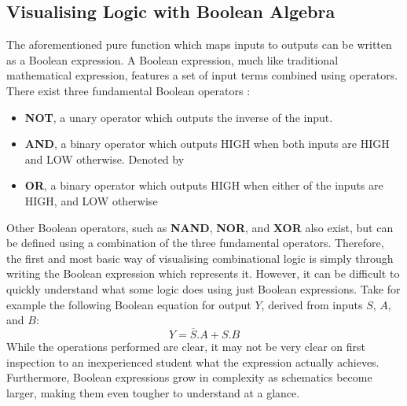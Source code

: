 \subsection{Visualising Logic with Boolean Algebra}
The aforementioned pure function which maps inputs to outputs can be written as a Boolean expression. A Boolean expression, much like traditional mathematical expression, features a set of input terms combined using operators. There exist three fundamental Boolean operators \cite{gregg_boolean}:
\begin{itemize}
    \item[] \textbf{NOT}, a unary operator which outputs the inverse of the input.
    \item[]\textbf{AND}, a binary operator which outputs HIGH when both inputs are HIGH and LOW otherwise. Denoted by 
    \item[] \textbf{OR}, a binary operator which outputs HIGH when either of the inputs are HIGH, and LOW otherwise
\end{itemize}
Other Boolean operators, such as \textbf{NAND}, \textbf{NOR}, and \textbf{XOR} also exist, but can be defined using a combination of the three fundamental operators.
Therefore, the first and most basic way of visualising combinational logic is simply through writing the Boolean expression which represents it. However, it can be difficult to quickly understand what some logic does using just Boolean expressions. Take for example the following Boolean equation for output $Y$, derived from inputs $S$, $A$, and $B$:
\begin{equation}
       Y = \overline{S}.A + S.B
       \label{equ:MuxEq}
\end{equation}
While the operations performed are clear, it may not be very clear on first inspection to an inexperienced student what the expression actually achieves. Furthermore, Boolean expressions grow in complexity as schematics become larger, making them even tougher to understand at a glance.

